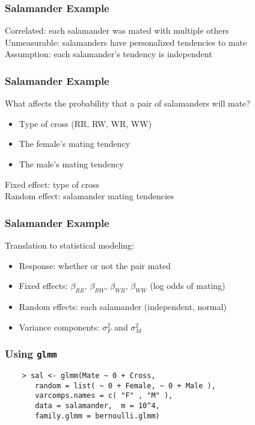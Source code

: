 \documentclass{beamer}
\begin{document}
\begin{frame}
\frametitle{Salamander Example}

Correlated: each salamander was mated with multiple others\\
\vspace{.4cm}
Unmeasurable: salamanders have personalized tendencies to mate \\
\vspace{.4cm}
Assumption: each salamander's tendency is independent


\end{frame}

\begin{frame}
\frametitle{Salamander Example}

What affects the probability that a pair of salamanders will mate?
\begin{itemize}
    \item Type of cross (RR, RW, WR, WW)
    \item The female's mating tendency 
    \item The male's mating tendency
\end{itemize}
\pause
\vspace{.5cm}
Fixed effect: type of cross\\
\vspace{.25cm}
Random effect: salamander mating tendencies

\end{frame}

\begin{frame}
\frametitle{Salamander Example} 

Translation to statistical modeling:
\begin{itemize}
\item Response: whether or not the pair mated
\item Fixed effects: $\beta_{RR}, \, \beta_{RW}, \, \beta_{WR}, \, \beta_{WW}$ (log odds of mating)
\item Random effects: each salamander (independent, normal)
\item Variance components: $\sigma_F^2$ and $\sigma_M^2$
\end{itemize}

\end{frame}

\begin{frame}[fragile]
\frametitle{Using \texttt{glmm}}

\begin{verbatim}
    > sal <- glmm(Mate ~ 0 + Cross, 
       random = list( ~ 0 + Female, ~ 0 + Male ), 
       varcomps.names = c( "F" , "M" ), 
       data = salamander,  m = 10^4,
       family.glmm = bernoulli.glmm)
\end{verbatim}

\end{frame}
\end{document}
